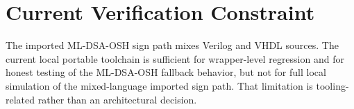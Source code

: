 \section{Current Verification Constraint}
The imported ML-DSA-OSH sign path mixes Verilog and VHDL sources. The current local portable toolchain is sufficient for wrapper-level regression and for honest testing of the ML-DSA-OSH fallback behavior, but not for full local simulation of the mixed-language imported sign path. That limitation is tooling-related rather than an architectural decision.
